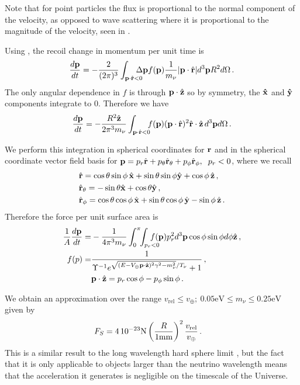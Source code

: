 Note that for point particles the flux is proportional to the normal component of the velocity, as opposed to wave scattering where it is proportional to the magnitude of the velocity, seen in .

Using , the recoil change in momentum per unit time is  
\begin{equation}
\frac{d{\bf p}}{dt}= -\frac{2}{(2\pi)^3}\int_{{\bf p}\cdot \hat{\bf r}<0} \!\!\!\!\!\!\Delta {\bf p}  f({\bf p}) \frac{1}{m_\nu}|{\bf p}\cdot \hat{\bf r}| d^3{\bf p}R^2d\Omega\,.
\end{equation}
The only angular dependence in $f$ is through ${\bf p}\cdot \hat {\bf z}$ so by symmetry, the ${\bf \hat x}$ and ${\bf \hat y}$ components integrate to $0$.  Therefore we have
\begin{equation}
\frac{d{\bf p}}{dt}=-\frac{R^2\hat{\bf z}}{2\pi^3m_\nu}\int_{{\bf p}\cdot \hat{\bf r}<0}\!\!\!   f({\bf p}) ({\bf p}\cdot \hat{\bf r})^2 \hat {\bf r}\cdot\hat{\bf z}\, d^3{\bf p}d\Omega\,.  
\end{equation}

We perform this integration in spherical coordinates for ${\bf r}$ and in the spherical coordinate vector field basis for ${\bf p}=p_r\hat{\bf r} +p_\theta\hat{\bf r}_\theta+p_\phi\hat{\bf r}_\phi,\hspace{2mm} p_r<0$, where we recall
\begin{align}
&\hat{\bf r}=\cos  \theta \sin \phi \, \hat{\bf x}+\sin \theta \sin \phi \hat{\bf y}+\cos  \phi\,\hat{\bf z}\notag\,,\\
&\hat{\bf r}_\theta=-\sin \theta \hat{\bf x}+\cos \theta \hat{\bf y}\,,\\
&\hat{\bf r}_\phi=\cos \theta \cos \phi\,\hat{\bf x}+\sin \theta \cos \phi \,\hat{\bf y}-\sin \phi \, \hat{\bf z}\notag\,.
\end{align}
Therefore the force per unit surface area is
\begin{align}
\frac{1}{A}\frac{d{\bf p}}{dt}=&-\frac{1}{4\pi^3 m_\nu}\int_0^\pi\!\!\int_{p_r<0}\!\!\!\!\!\!\!\! f({\bf p}) p_r^2  d^3{\bf p}\cos \phi \sin \phi  d\phi\hat{\bf z}\,,\notag\\
f({\bf}p)=&\frac{1}{  \Upsilon^{-1}e^{\sqrt{( E-V_\oplus {\bf p}\cdot \hat {\bf z})^2\gamma^2-m_\nu^2}/T_\nu}+1 }\,,\\
          &{\bf p}\cdot\hat{\bf z}=p_r\cos \phi-p_\phi\sin\phi \,.\notag
\end{align}

We obtain an approximation over the range $v_{\text{rel}}\leq v_\oplus ;\ 0.05\text{eV}\leq m_\nu\leq 0.25\text{eV}$ given by
\begin{align}
&F_S =  4\,10^{-23} \text{N}\left(\frac{R}{1{\rm mm}}\right)^2\frac{v_{\text{rel}}}{ v_\oplus}\,.
\end{align}
This is a similar result to the long wavelength hard sphere limit , but the fact that it is only applicable to objects larger than the neutrino wavelength means that the acceleration it generates is negligible on the timescale of the Universe.

